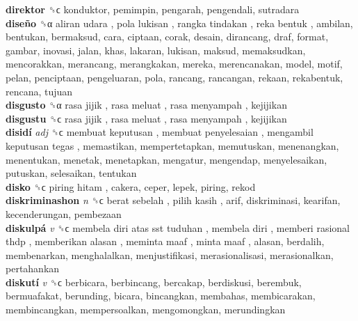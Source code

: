 \textbf{direktor} ␝ϲ  konduktor, pemimpin, pengarah, pengendali, sutradara  \\
\textbf{diseño} ␝α   aliran udara ,  pola lukisan ,  rangka tindakan ,  reka bentuk , ambilan, bentukan, bermaksud, cara, ciptaan, corak, desain, dirancang, draf, format, gambar, inovasi, jalan, khas, lakaran, lukisan, maksud, memaksudkan, mencorakkan, merancang, merangkakan, mereka, merencanakan, model, motif, pelan, penciptaan, pengeluaran, pola, rancang, rancangan, rekaan, rekabentuk, rencana, tujuan  \\
\textbf{disgusto} ␝α   rasa jijik ,  rasa meluat ,  rasa menyampah , kejijikan  \\
\textbf{disgustu} ␝ϲ   rasa jijik ,  rasa meluat ,  rasa menyampah , kejijikan  \\
\textbf{disidí} \emph{adj}  ␝ϲ   membuat keputusan ,  membuat penyelesaian ,  mengambil keputusan tegas , memastikan, mempertetapkan, memutuskan, menenangkan, menentukan, menetak, menetapkan, mengatur, mengendap, menyelesaikan, putuskan, selesaikan, tentukan  \\
\textbf{disko} ␝ϲ   piring hitam , cakera, ceper, lepek, piring, rekod  \\
\textbf{diskriminashon} \emph{n}  ␝ϲ   berat sebelah ,  pilih kasih , arif, diskriminasi, kearifan, kecenderungan, pembezaan  \\
\textbf{diskulpá} \emph{v}  ␝ϲ   membela diri  atas sst tuduhan ,  membela diri ,  memberi rasional thdp ,  memberikan alasan ,  meminta maaf ,  minta maaf , alasan, berdalih, membenarkan, menghalalkan, menjustifikasi, merasionalisasi, merasionalkan, pertahankan  \\
\textbf{diskutí} \emph{v}  ␝ϲ  berbicara, berbincang, bercakap, berdiskusi, berembuk, bermuafakat, berunding, bicara, bincangkan, membahas, membicarakan, membincangkan, mempersoalkan, mengomongkan, merundingkan  \\
